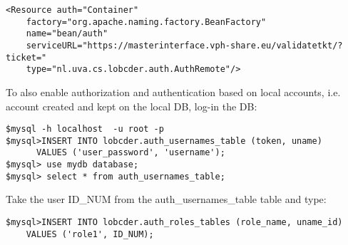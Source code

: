 \documentclass[a4paper,10pt]{article}
\begin{document}
\begin{lstlisting}
<Resource auth="Container" 
    factory="org.apache.naming.factory.BeanFactory" 
    name="bean/auth" 
    serviceURL="https://masterinterface.vph-share.eu/validatetkt/?ticket="
    type="nl.uva.cs.lobcder.auth.AuthRemote"/>  
\end{lstlisting}

To also enable authorization and authentication based on local accounts, i.e. account created and kept on the local 
DB, log-in the DB: 
\begin{lstlisting}
$mysql -h localhost  -u root -p
$mysql>INSERT INTO lobcder.auth_usernames_table (token, uname) 
      VALUES ('user_password', 'username');
$mysql> use mydb database;
$mysql> select * from auth_usernames_table;
\end{lstlisting}

Take the user ID\_NUM from the auth\_usernames\_table table and type:
\begin{lstlisting}
$mysql>INSERT INTO lobcder.auth_roles_tables (role_name, uname_id)
    VALUES ('role1', ID_NUM);
\end{lstlisting}

% 
% 
\end{document}
